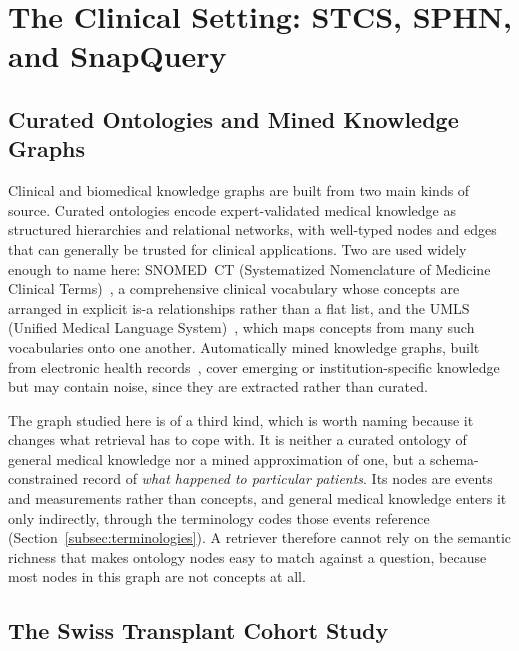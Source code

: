 \section{The Clinical Setting: STCS, SPHN, and SnapQuery} \label{sec:clinical-kg}

\subsection{Curated Ontologies and Mined Knowledge Graphs} \label{subsec:curated-ontologies}

Clinical and biomedical knowledge graphs are built from two main kinds of source.
Curated ontologies encode expert-validated medical knowledge as structured
hierarchies and relational networks, with well-typed nodes and edges that can
generally be trusted for clinical applications. Two are used widely enough to
name here: SNOMED~CT (Systematized Nomenclature of Medicine Clinical
Terms)~\cite{snomedct}, a comprehensive clinical vocabulary whose concepts are
arranged in explicit is-a relationships rather than a flat list, and the UMLS
(Unified Medical Language System)~\cite{bodenreider2004umls}, which maps concepts
from many such vocabularies onto one another. Automatically mined
knowledge graphs, built from electronic health records~\cite{rotmensch2017learning},
cover emerging or institution-specific knowledge but may contain noise, since
they are extracted rather than curated.

The graph studied here is of a third kind, which is worth naming because it
changes what retrieval has to cope with. It is neither a curated ontology of
general medical knowledge nor a mined approximation of one, but a
schema-constrained record of \emph{what happened to particular patients}. Its
nodes are events and measurements rather than concepts, and general medical
knowledge enters it only indirectly, through the terminology codes those events
reference (Section~\ref{subsec:terminologies}). A retriever therefore cannot rely
on the semantic richness that makes ontology nodes easy to match against a
question, because most nodes in this graph are not concepts at all.

\subsection{The Swiss Transplant Cohort Study} \label{subsec:stcs-background}

